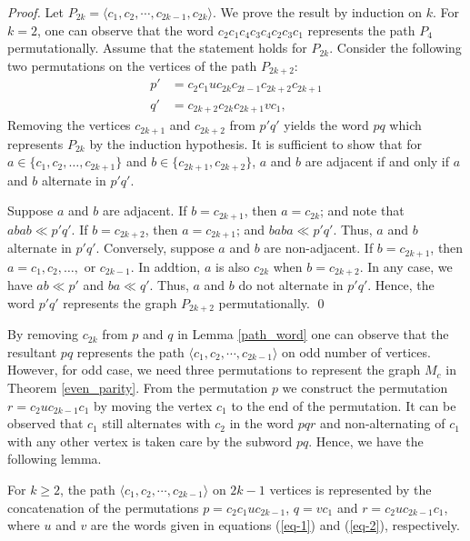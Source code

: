 \documentclass{llncs}
\begin{document}
\begin{proof}
	Let $P_{2k} = \langle  c_1, c_2,  \cdots, c_{2k-1}, c_{2k} \rangle$. We prove the result by induction on $k$.  For $k =2$,  one can observe that the word $c_2c_1c_4 c_3 c_4 c_2c_3 c_1$ represents the path $P_4$ permutationally.
	Assume that the statement holds for $P_{2k}$. Consider the following two permutations on the vertices of the path $P_{2k+2}$:
	\begin{align*}
		p' &= c_2 c_1 u c_{2k} c_{2t-1} c_{2k+2} c_{2k+1}\\
		q' &= c_{2k+2}c_{2k} c_{2k+1} v c_1,	
	\end{align*}
	Removing the vertices $c_{2k+1}$ and $c_{2k+2}$ from $p'q'$ yields the word $pq$ which represents $P_{2k}$ by the induction hypothesis. It is sufficient to show that for $a \in \{c_1, c_2, \ldots, c_{2k+1}\}$ and $b \in \{c_{2k+1}, c_{2k+2}\}$, $a$ and $b$ are adjacent if and only if $a$ and $b$ alternate in $p'q'$.
	
	Suppose $a$ and $b$ are adjacent. If $b = c_{2k+1}$, then $a = c_{2k}$; and note that $abab \ll p'q'$. If $b = c_{2k+2}$, then $a = c_{2k+1} $; and $baba \ll p'q'$. Thus, $a$ and $b$ alternate in $p'q'$. Conversely, suppose $a$ and $b$ are non-adjacent. If $b = c_{2k+1}$, then $a = c_1, c_2, \ldots,$ or $c_{2k-1}$. In addtion, $a$ is also $c_{2k}$ when $b = c_{2k+2}$. In any case, we have $ab \ll p'$ and $ba \ll q'$. Thus, $a$ and $b$ do not alternate in $p'q'$.		
	Hence, the word $ p'q'$ represents the graph $P_{2k+2}$ permutationally. \qed 
\end{proof}

By removing $c_{2k}$ from $p$ and $q$ in Lemma \ref{path_word} one can observe that the resultant $pq$ represents the path $\langle  c_1, c_2,  \cdots, c_{2k-1} \rangle$ on odd number of vertices. However, for odd case, we need three permutations to represent the graph $M_c$ in Theorem \ref{even_parity}. From the permutation $p$ we construct the permutation $r = c_2u c_{2k-1} c_1$ by moving the vertex $c_1$ to the end of the permutation. It can be observed that $c_1$ still alternates with $c_2$ in the word $pqr$ and non-alternating of $c_1$ with any other vertex is taken care by the subword $pq$. Hence, we have the following lemma. 

\begin{lemma}\label{path_2k-1}
	For $k \ge 2$, the path $\langle  c_1, c_2,  \cdots, c_{2k-1}  \rangle$ on $2k-1$ vertices is represented  by the concatenation of the permutations $p = c_{2} c_1 u   c_{2k-1}$, $q = v c_1$ and $r = c_2u c_{2k-1} c_1$, where $u$ and $v$ are the words given in equations (\ref{eq-1}) and (\ref{eq-2}), respectively.
\end{lemma}
\end{document}
